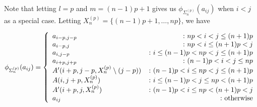 \documentclass{amsart}[11pt,fullpage]
\theoremstyle{definition}
\begin{document}
\noindent Note that letting $l=p$ and $m=(n-1)p+1$ gives us $\phi_{\Sigma_n^{(p)}}(a_{ij})$ when $i<j$ as a special case. Letting $X_n^{(p)} = \{(n-1)p+1,\ldots,np\}$, we have

$$
\phi_{\Sigma_n^{(p)}}(a_{ij}) =
\left\{
     \begin{array}{lr}
       a_{i-p,j-p} & \colon np< i<j\le (n+1)p\\
       a_{i-p,j} &\colon np< i\le (n+1)p< j\\
       a_{i,j-p} & \colon i\le(n-1)p<np< j\le(n+1)p\\
       a_{i+p,j+p} &\colon (n-1)p< i<j\le np\\
       A'(i+p,j-p,X_n^{(p)}\setminus (j-p)) & \colon (n-1)p< i\le np< j \le (n+1)p\\
       A(i,j+p,X_n^{(p)}) & \colon i\le(n-1)p< j \le np<(n+1)p\\
       A'(i+p,j,X_n^{(p)}) & \colon (n-1)p< i \le np<(n+1)p< j\\
       a_{ij} & \colon \textnormal{otherwise}
     \end{array}
\right.
$$
\end{document}
